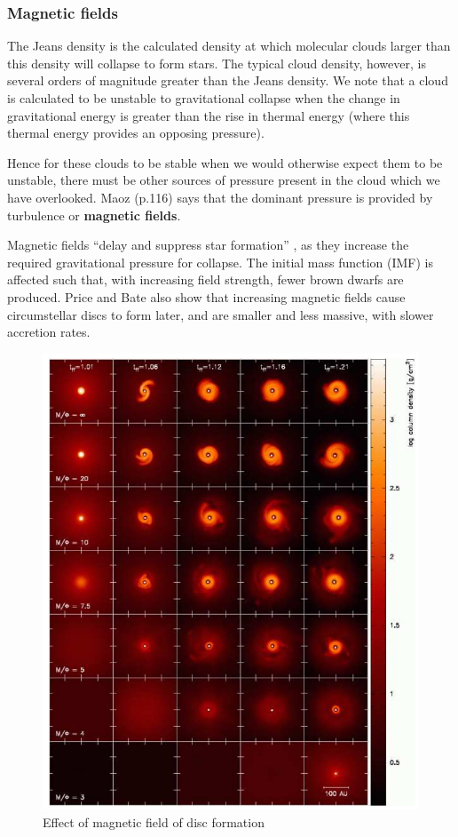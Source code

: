 \documentclass[a4paper]{article} %
\begin{document}
\subsubsection{Magnetic fields}

The Jeans density is the calculated density at which molecular clouds larger than this density will collapse to form stars. The typical cloud density, however, is several orders of magnitude greater than the Jeans density. We note that a cloud is calculated to be unstable to gravitational collapse when the change in gravitational energy is greater than the rise in thermal energy (where this thermal energy provides an opposing pressure). 

Hence for these clouds to be stable when we would otherwise expect them to be unstable, there must be other sources of pressure present in the cloud which we have overlooked. Maoz (p.116) \cite{Maoz} says that the dominant pressure is provided by turbulence or \textbf{magnetic fields}.

Magnetic fields ``delay and suppress star formation'' \cite{Magnetic}, as they increase the required gravitational pressure for collapse. The initial mass function (IMF) is affected such that, with increasing field strength, fewer brown dwarfs are produced. Price and Bate \cite{PriceAndBate} also show that increasing magnetic fields cause circumstellar discs to form later, and are smaller and less massive, with slower accretion rates.

\pagebreak

\begin{figure}[h]
\centering
\includegraphics[height=0.6\textheight]{images/MF_disc_formation.png}
\caption{Effect of magnetic field of disc formation}
\label{MF}
\end{figure}
\end{document}
